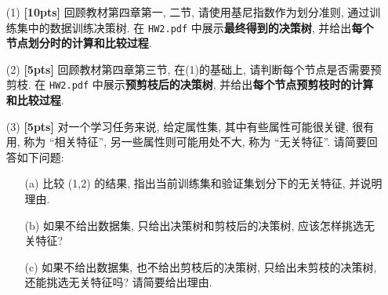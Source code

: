 \documentclass[a4paper]{article}
\numberwithin{equation}{section}
\theoremstyle{definition}
\begin{document}
\begin{enumerate}
    \item[(1)] \textbf{[10pts]} 回顾教材第四章第一, 二节, 请使用基尼指数作为划分准则, 通过训练集中的数据训练决策树. 在 \texttt{HW2.pdf} 中展示\textbf{最终得到的决策树}, 并给出\textbf{每个节点划分时的计算和比较过程}.
    \item[(2)] \textbf{[5pts]} 回顾教材第四章第三节, 在(1)的基础上, 请判断每个节点是否需要预剪枝. 在 \texttt{HW2.pdf} 中展示\textbf{预剪枝后的决策树}, 并给出\textbf{每个节点预剪枝时的计算和比较过程}.
    \item[(3)] \textbf{[5pts]} 对一个学习任务来说, 给定属性集, 其中有些属性可能很关键, 很有用, 称为 ``相关特征'', 另一些属性则可能用处不大, 称为 ``无关特征''. 请简要回答如下问题:
          \begin{itemize}
              \item[(a)] 比较 (1,2) 的结果, 指出当前训练集和验证集划分下的无关特征, 并说明理由.
              \item[(b)] 如果不给出数据集, 只给出决策树和剪枝后的决策树, 应该怎样挑选无关特征?
              \item[(c)] 如果不给出数据集, 也不给出剪枝后的决策树, 只给出未剪枝的决策树, 还能挑选无关特征吗? 请简要给出理由.
          \end{itemize}
\end{enumerate}
\end{document}
